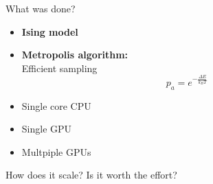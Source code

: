 \documentclass{beamer}
\begin{document}
\begin{frame}{What was done?}
    \begin{minipage}{0.5\paperwidth}
        \begin{itemize}
            \item \textbf{Ising model}
                \noindent \ising
            \item \textbf{Metropolis algorithm:}\\
                Efficient sampling
                \begin{equation*}
                    p_a = e^{-\frac{\Delta E}{k_B T}}
                \end{equation*}
        \end{itemize}
    \end{minipage} \pause
    \hfill
    \begin{minipage}[c]{0.3\paperwidth}
        \begin{itemize}%
            \item Single core CPU \pause
            \item Single GPU \pause
            \item Multpiple GPUs \pause
        \end{itemize}
    \end{minipage}
\begin{mybox}
    How does it scale? Is it worth the effort?
\end{mybox}
\end{frame}
\end{document}
